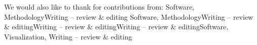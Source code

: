 \markdownRendererDlEnd\markdownRendererInterblockSeparator
{}We would also like to thank for contributions from:\markdownRendererInterblockSeparator
{}\markdownRendererDlBegin
{}\markdownRendererDlDefinitionBegin Software, Methodology\markdownRendererDlDefinitionEnd \markdownRendererDlItemEnd {}\markdownRendererDlDefinitionBegin Writing – review \& editing \markdownRendererDlDefinitionEnd \markdownRendererDlItemEnd {}\markdownRendererDlDefinitionBegin Software, Methodology\markdownRendererDlDefinitionEnd \markdownRendererDlItemEnd {}\markdownRendererDlDefinitionBegin Writing – review \& editing\markdownRendererDlDefinitionEnd \markdownRendererDlItemEnd {}\markdownRendererDlDefinitionBegin Writing – review \& editing\markdownRendererDlDefinitionEnd \markdownRendererDlItemEnd {}\markdownRendererDlDefinitionBegin Writing – review \& editing\markdownRendererDlDefinitionEnd \markdownRendererDlItemEnd {}\markdownRendererDlDefinitionBegin Software, Visualization, Writing – review \& editing\markdownRendererDlDefinitionEnd \markdownRendererDlItemEnd 
\markdownRendererDlEnd\markdownRendererInterblockSeparator
{}%
